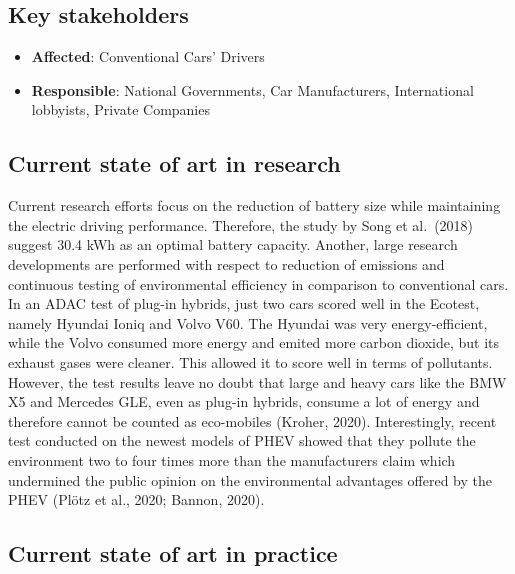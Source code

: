 \documentclass[
]{book}
\providecommand{\tightlist}{%
  \setlength{\itemsep}{0pt}\setlength{\parskip}{0pt}}
\begin{document}
\hypertarget{key-stakeholders-10}{%
\subsection*{Key stakeholders}\label{key-stakeholders-10}}

\begin{itemize}
\tightlist
\item
  \textbf{Affected}: Conventional Cars' Drivers
\item
  \textbf{Responsible}: National Governments, Car Manufacturers, International lobbyists, Private Companies
\end{itemize}

\hypertarget{current-state-of-art-in-research-10}{%
\subsection*{Current state of art in research}\label{current-state-of-art-in-research-10}}

Current research efforts focus on the reduction of battery size while maintaining the electric driving performance. Therefore, the study by Song et al.~(2018) suggest 30.4 kWh as an optimal battery capacity. Another, large research developments are performed with respect to reduction of emissions and continuous testing of environmental efficiency in comparison to conventional cars. In an ADAC test of plug-in hybrids, just two cars scored well in the Ecotest, namely Hyundai Ioniq and Volvo V60. The Hyundai was very energy-efficient, while the Volvo consumed more energy and emited more carbon dioxide, but its exhaust gases were cleaner. This allowed it to score well in terms of pollutants. However, the test results leave no doubt that large and heavy cars like the BMW X5 and Mercedes GLE, even as plug-in hybrids, consume a lot of energy and therefore cannot be counted as eco-mobiles (Kroher, 2020). Interestingly, recent test conducted on the newest models of PHEV showed that they pollute the environment two to four times more than the manufacturers claim which undermined the public opinion on the environmental advantages offered by the PHEV (Plötz et al., 2020; Bannon, 2020).

\hypertarget{current-state-of-art-in-practice-10}{%
\subsection*{Current state of art in practice}\label{current-state-of-art-in-practice-10}}
\end{document}
